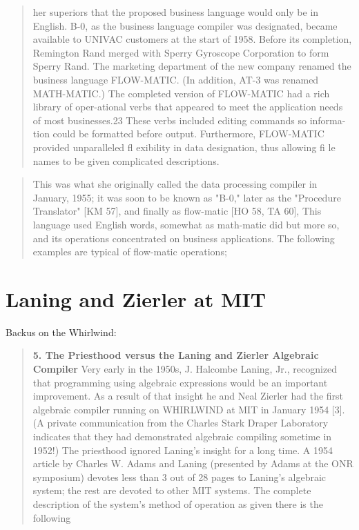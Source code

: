 \begin{quotation}
her superiors that the proposed business language would only be in English.  
B-0, as the business language compiler was designated, became available to 
UNIVAC customers at the start of 1958. Before its completion, Remington Rand 
merged with Sperry Gyroscope Corporation to form Sperry Rand. The marketing 
department of the new company renamed the business language FLOW-MATIC. (In 
addition, AT-3 was renamed MATH-MATIC.) The completed version of FLOW-MATIC had 
a rich library of oper-ational verbs that appeared to meet the application 
needs of most businesses.23 These verbs included editing commands so 
informa-tion could be formatted before output. Furthermore, FLOW-MATIC provided 
unparalleled fl exibility in data designation, thus allowing fi le names to be 
given complicated descriptions.
\end{quotation}

\begin{quotation}
This was what she originally called the data processing compiler in January, 
1955; it was soon to be known as "B-0," later as the "Procedure Translator" [KM 
57], and finally as flow-matic [HO 58, TA 60], This language used English 
words, somewhat as math-matic did but more so, and its operations concentrated 
on business applications. The following examples are typical of flow-matic 
operations;
\cite{history_of_computing_in_the_twentieth_century_1980}
\end{quotation}

\section{Laning and Zierler at MIT}
\label{sec:laning-zierler}


Backus on the Whirlwind\cite{Backus_1980_Programming_in_America_in_1950s}:
\begin{quotation}
    \textbf{5. The Priesthood versus the Laning and Zierler Algebraic Compiler}
Very early in the 1950s, J. Halcombe Laning, Jr., recognized that programming using algebraic expressions would be an important improvement.
As a result of that insight he and Neal Zierler had the first algebraic compiler
running on WHIRLWIND at MIT in January 1954 [3]. (A private communication from the Charles Stark Draper Laboratory indicates that they had
demonstrated algebraic compiling sometime in 1952!) The priesthood ignored Laning's insight for a long time. A 1954 article by Charles W. Adams
and Laning (presented by Adams at the ONR symposium) devotes less than
3 out of 28 pages to Laning's algebraic system; the rest are devoted to other
MIT systems. The complete description of the system's method of operation
as given there is the following
\end{quotation}

